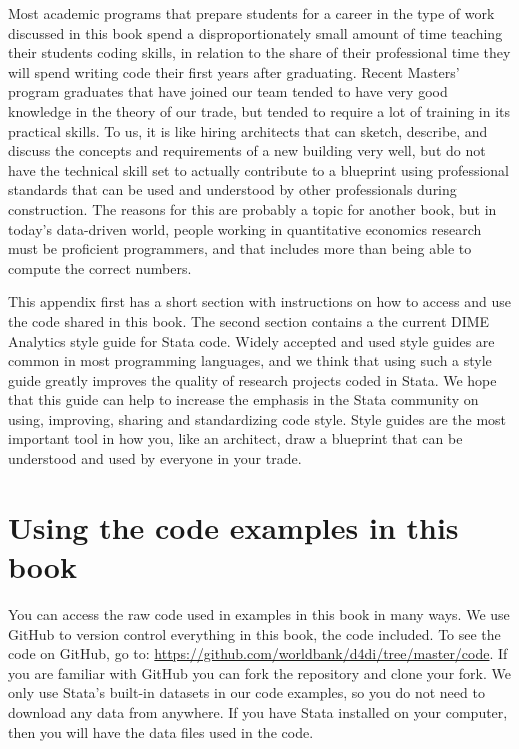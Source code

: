 
\begin{fullwidth}

Most academic programs that prepare students for a career in the type of work discussed in this book
spend a disproportionately small amount of time teaching their students coding skills, in relation to the share of
their professional time they will spend writing code their first years after graduating. Recent
Masters' program graduates that have joined our team tended to have very good knowledge in the theory of our
trade, but tended to require a lot of training in its practical skills. To us, it is like hiring architects
that can sketch, describe, and discuss the concepts and requirements of a new building very well, but do
not have the technical skill set to actually contribute to a blueprint using professional standards that can be used
and understood by other professionals during construction. The reasons for this are probably a topic
for another book, but in today's data-driven world, people working in quantitative economics research
must be proficient programmers, and that includes more than being able to compute the correct numbers.

This appendix first has a short section with instructions on how to access and use the code shared in
this book. The second section contains a the current DIME Analytics style guide for Stata code.
Widely accepted and used style guides are common in most programming languages,
and we think that using such a style guide greatly improves the quality
of research projects coded in Stata. We hope that this guide can  help to increase the emphasis in the Stata community on using,
improving, sharing and standardizing code style. Style guides are the most important tool in how
you, like an architect, draw a blueprint that can be understood and used by everyone in your trade.

\end{fullwidth}


\section{Using the code examples in this book}

You can access the raw code used in examples in this book in many ways.
We use GitHub to version control everything in this book, the code included.
To see the code on GitHub, go to: \url{https://github.com/worldbank/d4di/tree/master/code}.
If you are familiar with GitHub you can fork the repository and clone your fork.
We only use Stata's built-in datasets in our code examples,
so you do not need to download any data from anywhere.
If you have Stata installed on your computer, then you will have the data files used in the code.

